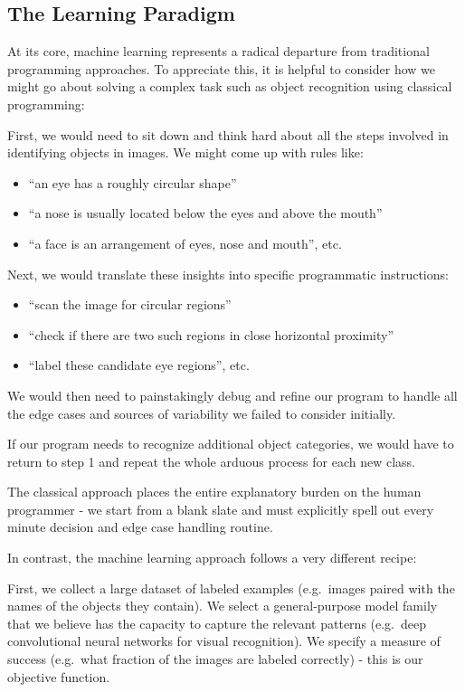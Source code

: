 \documentclass[
  9pt,
  letterpaper,
  abstract,
  titlepage]{scrbook}
\providecommand{\tightlist}{%
  \setlength{\itemsep}{0pt}\setlength{\parskip}{0pt}}\usepackage{longtable,booktabs,array}
\def\tightlist{}
\let\tightlist\relax
\begin{document}
\subsection{The Learning Paradigm}\label{the-learning-paradigm}

At its core, machine learning represents a radical departure from
traditional programming approaches. To appreciate this, it is helpful to
consider how we might go about solving a complex task such as object
recognition using classical programming:

First, we would need to sit down and think hard about all the steps
involved in identifying objects in images. We might come up with rules
like:

\begin{itemize}
\tightlist
\item
  ``an eye has a roughly circular shape''
\item
  ``a nose is usually located below the eyes and above the mouth''
\item
  ``a face is an arrangement of eyes, nose and mouth'', etc.
\end{itemize}

Next, we would translate these insights into specific programmatic
instructions:

\begin{itemize}
\tightlist
\item
  ``scan the image for circular regions''
\item
  ``check if there are two such regions in close horizontal proximity''
\item
  ``label these candidate eye regions'', etc.
\end{itemize}

We would then need to painstakingly debug and refine our program to
handle all the edge cases and sources of variability we failed to
consider initially.

If our program needs to recognize additional object categories, we would
have to return to step 1 and repeat the whole arduous process for each
new class.

The classical approach places the entire explanatory burden on the human
programmer - we start from a blank slate and must explicitly spell out
every minute decision and edge case handling routine.

In contrast, the machine learning approach follows a very different
recipe:

First, we collect a large dataset of labeled examples (e.g.~images
paired with the names of the objects they contain). We select a
general-purpose model family that we believe has the capacity to capture
the relevant patterns (e.g.~deep convolutional neural networks for
visual recognition). We specify a measure of success (e.g.~what fraction
of the images are labeled correctly) - this is our objective function.
\end{document}
